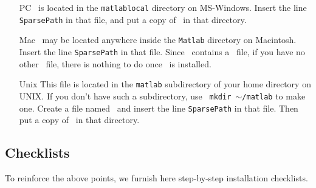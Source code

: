 \documentclass{article}
\begin{document}
\begin{itemize}
\item[PC] \Startup\ is located in the {\tt matlab\BS local} directory on MS-Windows.
Insert the line {\tt SparsePath} in that file, and put a copy of
\WavePath\ in that directory.

\item[Mac] \Startup\ may be located anywhere inside the {\tt Matlab} directory
on Macintosh. Insert the line {\tt SparsePath} in that file. Since
\WaveLab\ contains a \Startup\ file, if you have no other \Startup\
file, there is nothing to do once \WaveLab\ is installed.

\item[Unix] This file is located in the  {\tt matlab} subdirectory of your home
directory on UNIX. If you don't have such a subdirectory, use {\tt
mkdir $\sim$/matlab} to make one. Create a file named \Startup\ and
insert the line {\tt SparsePath} in that file.  Then put a copy of
\WavePath\ in that directory.

\end{itemize}

\subsection{Checklists}

To reinforce the above points, we furnish here step-by-step installation
checklists.
\end{document}
